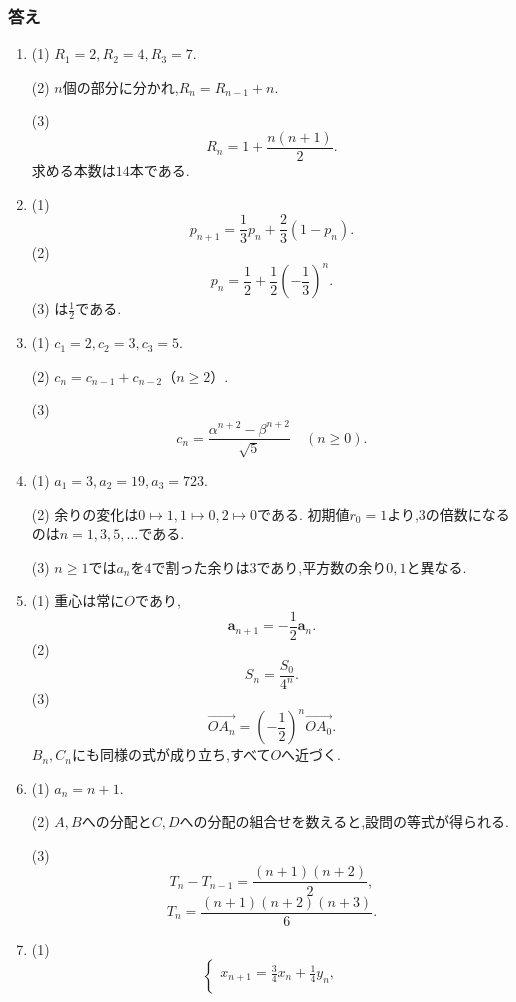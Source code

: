 \subsubsection{答え}\label{節：発展入門：答え}
\begin{enumerate}[label=\textbf{問\arabic*.},leftmargin=3.8em,format=\bookitemlink{practice-bridge}{answer}{solution}]
  \item (1) $R_1=2,R_2=4,R_3=7$.
    \par\smallskip\noindent
    (2) $n$個の部分に分かれ,$R_n=R_{n-1}+n$.
    \par\smallskip\noindent
    (3)
    \[
      R_n=1+\frac{n(n+1)}2.
    \]
    求める本数は$14$本である.
  \item (1)
    \[
      p_{n+1}=\frac13p_n+\frac23(1-p_n).
    \]
    (2)
    \[
      p_n=\frac12+\frac12\left(-\frac13\right)^n.
    \]
    (3) は$\frac12$である.
  \item (1) $c_1=2,c_2=3,c_3=5$.
    \par\smallskip\noindent
    (2) $c_n=c_{n-1}+c_{n-2}$（$n\ge2$）.
    \par\smallskip\noindent
    (3)
    \[
      c_n=\frac{\alpha^{n+2}-\beta^{n+2}}{\sqrt5}
      \quad(n\ge0).
    \]
  \item (1) $a_1=3,a_2=19,a_3=723$.
    \par\smallskip\noindent
    (2) 余りの変化は$0\mapsto1,1\mapsto0,2\mapsto0$である.
    初期値$r_0=1$より,$3$の倍数になるのは$n=1,3,5,\ldots$である.
    \par\smallskip\noindent
    (3) $n\ge1$では$a_n$を$4$で割った余りは$3$であり,平方数の余り$0,1$と異なる.
  \item (1) 重心は常に$O$であり,
    \[
      \boldsymbol a_{n+1}=-\frac12\boldsymbol a_n.
    \]
    (2)
    \[
      S_n=\frac{S_0}{4^n}.
    \]
    (3)
    \[
      \overrightarrow{OA_n}
      =\left(-\frac12\right)^n\overrightarrow{OA_0}.
    \]
    $B_n,C_n$にも同様の式が成り立ち,すべて$O$へ近づく.
  \item (1) $a_n=n+1$.
    \par\smallskip\noindent
    (2) $A,B$への分配と$C,D$への分配の組合せを数えると,設問の等式が得られる.
    \par\smallskip\noindent
    (3)
    \[
      T_n-T_{n-1}=\frac{(n+1)(n+2)}2,
    \]
    \[
      T_n=\frac{(n+1)(n+2)(n+3)}6.
    \]
  \item (1)
    \[
      \begin{cases}
        x_{n+1}=\frac34x_n+\frac14y_n,\\[3pt]

\end{cases}\]
\end{enumerate}

